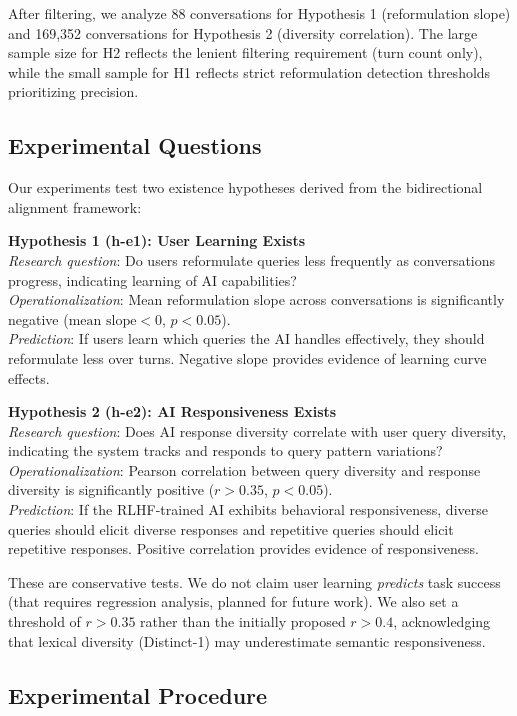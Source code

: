 After filtering, we analyze 88 conversations for Hypothesis 1 (reformulation slope) and 169,352 conversations for Hypothesis 2 (diversity correlation). The large sample size for H2 reflects the lenient filtering requirement (turn count only), while the small sample for H1 reflects strict reformulation detection thresholds prioritizing precision.

\subsection{Experimental Questions}

Our experiments test two existence hypotheses derived from the bidirectional alignment framework:

\textbf{Hypothesis 1 (h-e1): User Learning Exists}\\
\emph{Research question}: Do users reformulate queries less frequently as conversations progress, indicating learning of AI capabilities?\\
\emph{Operationalization}: Mean reformulation slope across conversations is significantly negative ($\text{mean slope} < 0$, $p < 0.05$).\\
\emph{Prediction}: If users learn which queries the AI handles effectively, they should reformulate less over turns. Negative slope provides evidence of learning curve effects.

\textbf{Hypothesis 2 (h-e2): AI Responsiveness Exists}\\
\emph{Research question}: Does AI response diversity correlate with user query diversity, indicating the system tracks and responds to query pattern variations?\\
\emph{Operationalization}: Pearson correlation between query diversity and response diversity is significantly positive ($r > 0.35$, $p < 0.05$).\\
\emph{Prediction}: If the RLHF-trained AI exhibits behavioral responsiveness, diverse queries should elicit diverse responses and repetitive queries should elicit repetitive responses. Positive correlation provides evidence of responsiveness.

These are conservative tests. We do not claim user learning \emph{predicts} task success (that requires regression analysis, planned for future work). We also set a threshold of $r > 0.35$ rather than the initially proposed $r > 0.4$, acknowledging that lexical diversity (Distinct-1) may underestimate semantic responsiveness.

\subsection{Experimental Procedure}

